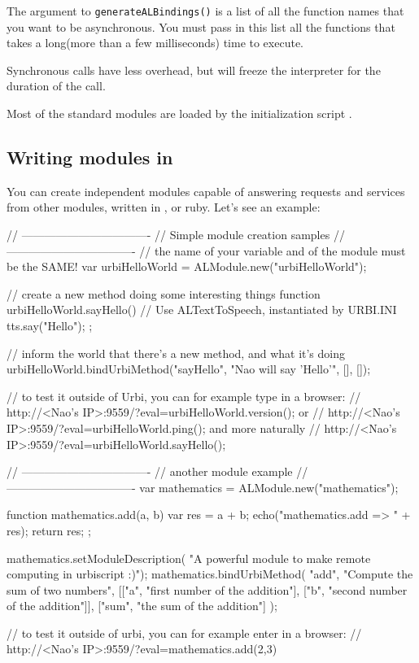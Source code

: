 The argument to \lstinline|generateALBindings()| is a list of all the
function names that you want to be asynchronous. You must pass in this
list all the functions that takes a long(more than a few milliseconds)
time to execute.

Synchronous calls have less overhead, but will freeze the \us
interpreter for the duration of the call.

Most of the standard modules are loaded by the initialization script
.

\subsection{Writing \naoqi modules in \urbi}

You can create independent modules capable of answering requests and
services from other \naoqi modules, written in \Cxx, \us or
ruby. Let's see an example:

\begin{urbiunchecked}
// ----------------------------------
// Simple module creation samples
// ----------------------------------
// the name of your variable and of the module must be the SAME!
var urbiHelloWorld = ALModule.new("urbiHelloWorld");

// create a new method doing some interesting things
function urbiHelloWorld.sayHello()
{
  // Use ALTextToSpeech, instantiated by URBI.INI
  tts.say("Hello");
};

// inform the world that there's a new method, and what it's doing
urbiHelloWorld.bindUrbiMethod("sayHello", "Nao will say 'Hello'", [], []);

// to test it outside of Urbi, you can for example type in a browser:
// http://<Nao's IP>:9559/?eval=urbiHelloWorld.version(); or
// http://<Nao's IP>:9559/?eval=urbiHelloWorld.ping(); and more naturally
// http://<Nao's IP>:9559/?eval=urbiHelloWorld.sayHello();

// ----------------------------------
// another module example
// ----------------------------------
var mathematics = ALModule.new("mathematics");

function mathematics.add(a, b)
{
  var res = a + b;
  echo("mathematics.add => " + res);
  return res;
};

mathematics.setModuleDescription(
  "A powerful module to make remote computing in urbiscript :)");
mathematics.bindUrbiMethod( "add", "Compute the sum of two numbers",
[["a",   "first number of the addition"],
 ["b",   "second number of the addition"]],
 ["sum", "the sum of the addition"] );

// to test it outside of urbi, you can for example enter in a browser:
// http://<Nao's IP>:9559/?eval=mathematics.add(2,3)
\end{urbiunchecked}


